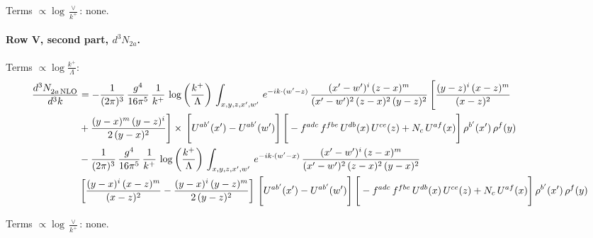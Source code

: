 \documentclass[10pt]{article}
\numberwithin{equation}{section}
\begin{document}
\noindent Terms $\propto\log\frac{\vee}{k^+}$: none.

\paragraph{Row V, second part, $d^3N_{2a}$.}
\noindent Terms $\propto\log\frac{k^+}{\Lambda}$:
\begin{align}
    \frac{d^{3}N_{2a\,\rm NLO}^{\rm}}{d^{3}k}  & =    - \frac{1}{(2\pi)^{3}}\, \frac{g^{4}}{16\pi^{5}}\,\frac{1}{k^{+}}\,\log{\left(\frac{k^{+}}{\Lambda}\right)}\, \int_{x,y,z,x',w'}\, e^{-ik\cdot(w'-z)}\,\frac{(x'-w')^{i}\,(z-x)^{m}}{(x'-w')^{2}\,(z-x)^{2}\, (y-z)^{2}}\,\Bigg[\frac{(y-z)^{i}\,(x-z)^{m}}{(x-z)^{2}}\notag \\ & +\frac{(y-x)^{m}\,(y-z)^{i}}{2\,(y-x)^{2}}\Bigg]\times\, \Bigg[U^{ab'}(x')-U^{ab'}(w')\Bigg]\,\Bigg[-f^{adc}\,f^{fbe}\,U^{db}(x)\,U^{ce}(z)+N_{c}\,U^{af}(x)\Bigg]\,\rho^{b'}(x')\,\rho^{f}(y) \notag \\
& - \frac{1}{(2\pi)^{3}}\, \frac{g^{4}}{16\pi^{5}}\,\frac{1}{k^{+}}\,\log{\left(\frac{k^{+}}{\Lambda}\right)}\, \int_{x,y,z,x',w'}\,e^{-ik\cdot(w'-x)}\,\frac{(x'-w')^{i}\,(z-x)^{m}}{(x'-w')^{2}\,(z-x)^{2}\,(y-x)^{2}} \notag \\ &\left[\frac{(y-x)^{i}\,(x-z)^{m}}{(x-z)^{2}}-\frac{(y-x)^{i}\,(y-z)^{m}}{2\,(y-z)^{2}}\right]\, \Bigg[U^{ab'}(x')-U^{ab'}(w')\Bigg]\,\Bigg[-f^{adc}\,f^{fbe}\,U^{db}(x)\,U^{ce}(z)+N_{c}\,U^{af}(x)\Bigg]\,\rho^{b'}(x')\,\rho^{f}(y) \label{eq:J:G1V2a}
\end{align}

\noindent Terms $\propto\log\frac{\vee}{k^+}$: none.
\end{document}
